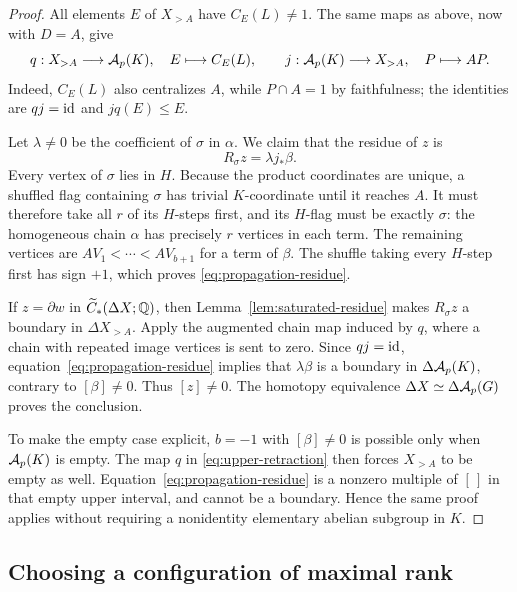 \begin{proof}
All elements $E$ of $X_{>A}$ have $C_E(L)\ne1$.  The same maps as
above, now with $D=A$, give
\begin{equation}\label{eq:upper-retraction}
 q:X_{>A}\longrightarrow\mathcal A_p(K),\quad E\longmapsto C_E(L),
 \qquad
 j:\mathcal A_p(K)\longrightarrow X_{>A},\quad P\longmapsto AP.
\end{equation}
Indeed, $C_E(L)$ also centralizes $A$, while $P\cap A=1$ by
faithfulness; the identities are $qj=\operatorname{id}$ and $jq(E)\le E$.

Let $\lambda\ne0$ be the coefficient of $\sigma$ in $\alpha$.
We claim that the residue of $z$ is
\begin{equation}\label{eq:propagation-residue}
 R_\sigma z=\lambda j_*\beta.
\end{equation}
Every vertex of $\sigma$ lies in $H$.  Because the product
coordinates are unique, a shuffled flag containing $\sigma$ has
trivial $K$-coordinate until it reaches $A$.  It must therefore
take all $r$ of its $H$-steps first, and its $H$-flag must be
exactly $\sigma$: the homogeneous chain $\alpha$ has precisely
$r$ vertices in each term.  The remaining vertices are
$AV_1<\cdots<AV_{b+1}$ for a term of $\beta$.
The shuffle taking every $H$-step first has sign $+1$, which proves
\eqref{eq:propagation-residue}.

If $z=\partial w$ in $\widetilde C_*(\Delta X;\mathbb Q)$, then
Lemma~\ref{lem:saturated-residue} makes $R_\sigma z$ a boundary
in $\Delta X_{>A}$.  Apply the augmented chain map induced by $q$,
where a chain with repeated image vertices is sent to zero.
Since $qj=\operatorname{id}$, equation~\eqref{eq:propagation-residue} implies
that $\lambda\beta$ is a boundary in $\Delta\mathcal A_p(K)$, contrary
to $[\beta]\ne0$.  Thus $[z]\ne0$.  The homotopy equivalence
$\Delta X\simeq\Delta\mathcal A_p(G)$ proves the conclusion.

To make the empty case explicit, $b=-1$ with $[\beta]\ne0$ is
possible only when $\mathcal A_p(K)$ is empty.  The map $q$ in
\eqref{eq:upper-retraction} then forces $X_{>A}$ to be empty as
well.  Equation~\eqref{eq:propagation-residue} is a nonzero
multiple of $[\,]$ in that empty upper interval, and cannot be
a boundary.  Hence the same proof applies without requiring a
nonidentity elementary abelian subgroup in $K$.
\end{proof}

\subsection{Choosing a configuration of maximal rank}


